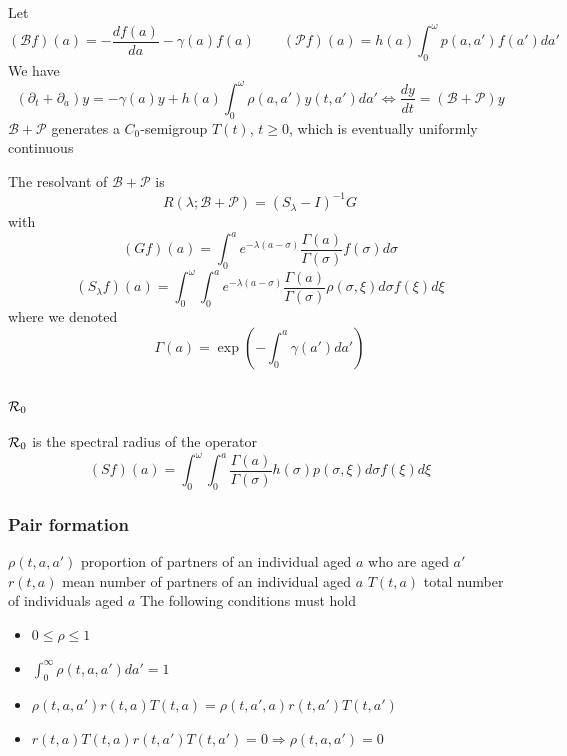 \documentclass[aspectratio=169]{beamer}\usepackage[]{graphicx}\usepackage[]{xcolor}
\begin{document}
\begin{frame}
Let
\[
(\mathcal{B}f)(a)=-\frac{df(a)}{da}-\gamma(a)f(a)
\quad\quad
(\mathcal{P}f)(a)=h(a)\int_0^\omega p(a,a')f(a')da'
\]
\vfill
We have
\[
(\partial_t+\partial_a)y=-\gamma(a)y+h(a)\int_0^\omega
\rho(a,a')y(t,a')da' \Leftrightarrow
\frac{dy}{dt}=(\mathcal{B}+\mathcal{P})y
\]
\vfill
$\mathcal{B}+\mathcal{P}$ generates a $C_0$-semigroup $T(t)$,
$t\geq 0$, which is eventually uniformly continuous
\end{frame}


\begin{frame}
The  resolvant of $\mathcal{B}+\mathcal{P}$ is
\[
R(\lambda;\mathcal{B}+\mathcal{P})=(S_\lambda-I)^{-1}G
\]
with
\[
(Gf)(a)=\int_0^a
e^{-\lambda(a-\sigma)}\frac{\Gamma(a)}{\Gamma(\sigma)}
f(\sigma)d\sigma
\]
\[
(S_\lambda f)(a)=\int_0^\omega\int_0^a
e^{-\lambda(a-\sigma)}\frac{\Gamma(a)}{\Gamma(\sigma)}
\rho(\sigma,\xi)d\sigma f(\xi)d\xi
\]
where we denoted
\[
\Gamma(a)=\exp\left(-\int_0^a \gamma(a')da'\right)
\]
\end{frame}


\begin{frame}\frametitle{$\mathcal{R}_0$}
$\mathcal{R}_0$ is the spectral radius of the operator
\[
(Sf)(a)=\int_0^\omega\int_0^a \frac{\Gamma(a)}{\Gamma(\sigma)}
h(\sigma)p(\sigma,\xi)d\sigma f(\xi)d\xi
\]
\end{frame}


\begin{frame}\frametitle{Pair formation}
$\rho(t,a,a')$ proportion of partners of an individual aged $a$ who are aged $a'$
\vfill
$r(t,a)$ mean number of partners of an individual aged $a$
\vfill
$T(t,a)$ total number of individuals aged $a$
\vfill
The following conditions must hold
\begin{itemize}
\item $0\leq\rho\leq 1$
\item $\int_0^\infty \rho(t,a,a')da'=1$
\item $\rho(t,a,a')r(t,a)T(t,a)=\rho(t,a',a)r(t,a')T(t,a')$
\item $r(t,a)T(t,a)r(t,a')T(t,a')=0\Rightarrow \rho(t,a,a')=0$
\end{itemize}
\end{frame}
\end{document}
